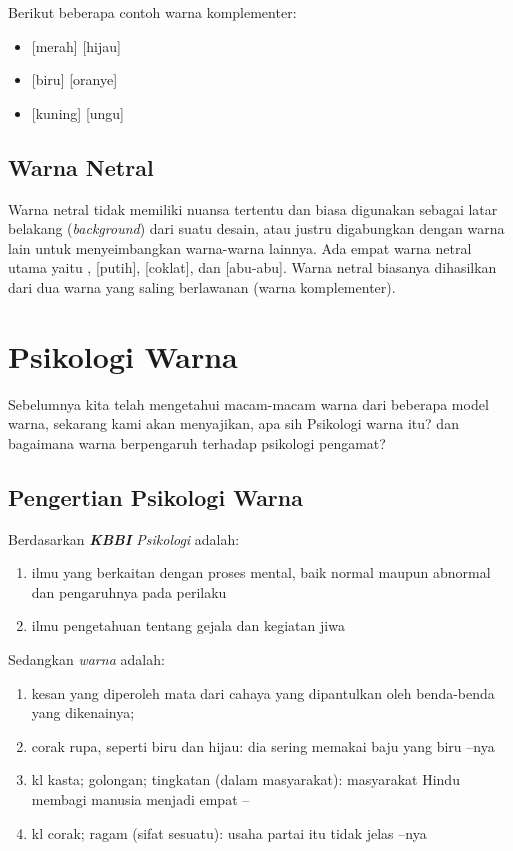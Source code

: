 \documentclass[a4paper]{article}
\newcommand{\warnalnbl}[1]{
  \tikz[baseline=-0.5\ht\strutbox]{
    \node[shape=rectangle, draw=black, fill=black, minimum height=1.5em, inner sep= 2pt, text=white]{#1}
  }
}
\begin{document}
Berikut beberapa contoh warna komplementer:
\begin{itemize}
  \item {}[merah] [hijau]
  \item {}[biru] [oranye]
  \item {}[kuning] [ungu]
\end{itemize}

\subsection{Warna Netral}
Warna netral tidak memiliki nuansa tertentu dan biasa digunakan sebagai latar belakang (\textit{background}) dari suatu desain, atau justru digabungkan dengan warna lain untuk menyeimbangkan warna-warna lainnya. Ada empat warna netral utama yaitu \warnalnbl{Hitam}, [putih], [coklat], dan [abu-abu]. Warna netral biasanya dihasilkan dari dua warna yang saling berlawanan (warna komplementer).

\section{Psikologi Warna}
Sebelumnya kita telah mengetahui macam-macam warna dari beberapa model warna, sekarang kami akan menyajikan, apa sih Psikologi warna itu? dan bagaimana warna berpengaruh terhadap psikologi pengamat?
\subsection{Pengertian Psikologi Warna}
Berdasarkan \textit{\textbf{KBBI} Psikologi} adalah:
\begin{enumerate}
  \item ilmu yang berkaitan dengan proses mental, baik normal maupun abnormal dan pengaruhnya pada perilaku
  \item ilmu pengetahuan tentang gejala dan kegiatan jiwa
\end{enumerate}
Sedangkan \textit{warna} adalah:
\begin{enumerate}
  \item kesan yang diperoleh mata dari cahaya yang dipantulkan oleh benda-benda yang dikenainya;
  \item corak rupa, seperti biru dan hijau: dia sering memakai baju yang biru --nya
  \item kl kasta; golongan; tingkatan (dalam masyarakat): masyarakat Hindu membagi manusia menjadi empat --
  \item kl corak; ragam (sifat sesuatu): usaha partai itu tidak jelas --nya
\end{enumerate}
\end{document}
